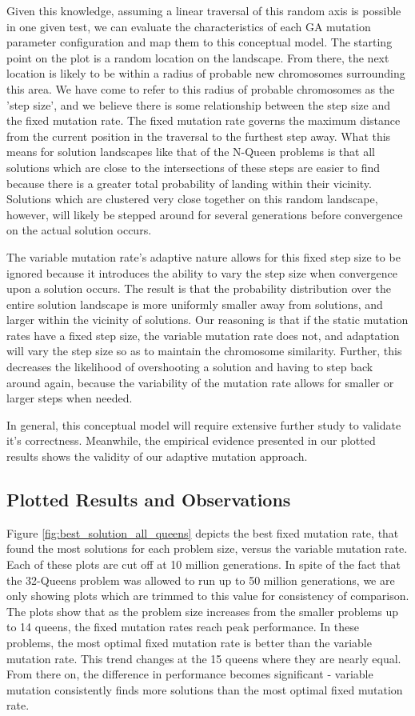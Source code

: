 \documentclass[conference]{IEEEtran}
\begin{document}
Given this knowledge, assuming a linear traversal of this random axis is possible in one given test, we can evaluate the characteristics of each GA mutation parameter configuration and map them to this conceptual model. The starting point on the plot is a random location on the landscape. From there, the next location is likely to be within a radius of probable new chromosomes surrounding this area. We have come to refer to this radius of probable chromosomes as the 'step size', and we believe there is some relationship between the step size and the fixed mutation rate. The fixed mutation rate governs the maximum distance from the current position in the traversal to the furthest step away. What this means for solution landscapes like that of the N-Queen problems is that all solutions which are close to the intersections of these steps are easier to find because there is a greater total probability of landing within their vicinity. Solutions which are clustered very close together on this random landscape, however, will likely be stepped around for several generations before convergence on the actual solution occurs.

The variable mutation rate's adaptive nature allows for this fixed step size to be ignored because it introduces the ability to vary the step size when convergence upon a solution occurs. The result is that the probability distribution over the entire solution landscape is more uniformly smaller away from solutions, and larger within the vicinity of solutions. Our reasoning is that if the static mutation rates have a fixed step size, the variable mutation rate does not, and adaptation will vary the step size so as to maintain the chromosome similarity. Further, this decreases the likelihood of overshooting a solution and having to step back around again, because the variability of the mutation rate allows for smaller or larger steps when needed.

In general, this conceptual model will require extensive further study to validate it's correctness. Meanwhile, the empirical evidence presented in our plotted results shows the validity of our adaptive mutation approach.

\subsection{Plotted Results and Observations}
Figure \ref{fig:best_solution_all_queens} depicts the best fixed mutation rate, that found the most solutions for each problem size, versus the variable mutation rate. Each of these plots are cut off at 10 million generations. In spite of the fact that the 32-Queens problem was allowed to run up to 50 million generations, we are only showing plots which are trimmed to this value for consistency of comparison. The plots show that as the problem size increases from the smaller problems up to 14 queens, the fixed mutation rates reach peak performance. In these problems, the most optimal fixed mutation rate is better than the variable mutation rate. This trend changes at the 15 queens where they are nearly equal. From there on, the difference in performance becomes significant - variable mutation consistently finds more solutions than the most optimal fixed mutation rate. 
\end{document}

